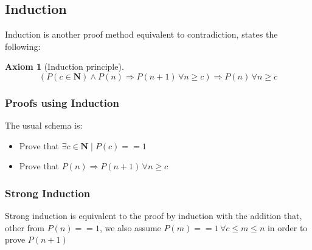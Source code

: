 \documentclass{report}
\newtheorem{axiom}{Axiom}[section]
\newcommand{\implies}{\Rightarrow}
\begin{document}
        \subsection{Induction}
            Induction is another proof method equivalent to contradiction, states the following:
            \begin{axiom}[Induction principle]
                $$\left(P\left(c \in \mathbf{N}\right) \land P\left(n\right) \implies P\left(n+1\right)
                    \, \forall n \geq c\right) \implies P\left(n\right) \, \forall n \geq c$$
            \end{axiom}
            \subsubsection{Proofs using Induction}
                The usual schema is:
                \begin{itemize}
                    \item Prove that $\exists c \in \mathbf{N} \mid P\left(c\right) == 1$
                    \item Prove that $P\left(n\right) \implies P\left(n+1\right) \, \forall n \geq c$
                \end{itemize}
            \subsubsection{Strong Induction}
                Strong induction is equivalent to the proof by induction with the addition 
                that, other from $P\left(n\right) == 1$, we also assume $P\left(m\right) == 1 \, \forall c \leq m \leq n$
                in order to prove $P\left(n+1\right)$
            
        
\end{document}
